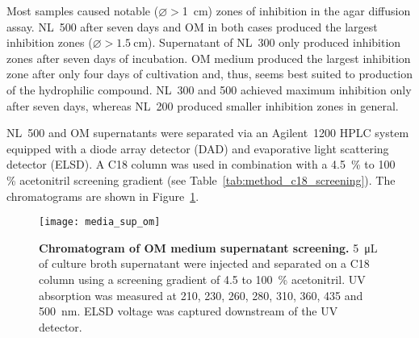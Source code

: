 Most samples caused notable ($\varnothing>$\SI{1}{\centi\meter}) zones of inhibition in the agar diffusion assay.
NL~500 after seven days and OM in both cases produced the largest inhibition zones ($\varnothing > \SI{1.5}{\centi\meter}$).
Supernatant of NL~300 only produced inhibition zones after seven days of incubation.
OM medium produced the largest inhibition zone after only four days of cultivation and, thus, seems best suited to production of the hydrophilic compound.
NL~300 and 500 achieved maximum inhibition only after seven days, whereas NL~200 produced smaller inhibition zones in general.

NL~500 and OM supernatants were separated via an Agilent~1200 HPLC system equipped with a diode array detector (DAD) and evaporative light scattering detector (ELSD).
A C18 column was used in combination with a 4.5~\% to 100~ \% acetonitril screening gradient (see Table~\ref{tab:method_c18_screening}).
The chromatograms are shown in Figure~\ref{fig:results_medium_screen}.


\begin{figure}[htbp]
	\centering
		\texttt{[image: media\_sup\_om]}
	\caption[Chromatogram of OM medium supernatant screening]{%
		\textbf{Chromatogram of OM medium supernatant screening.} \SI{5}{\micro\liter} of culture broth supernatant were injected and separated on a C18 column using a screening gradient of 4.5 to 100~\% acetonitril. 
		UV absorption was measured at 210, 230, 260, 280, 310, 360, 435 and 500~nm.
		ELSD voltage was captured downstream of the UV detector.
	}
	\label{fig:results_medium_screen}
\end{figure}

